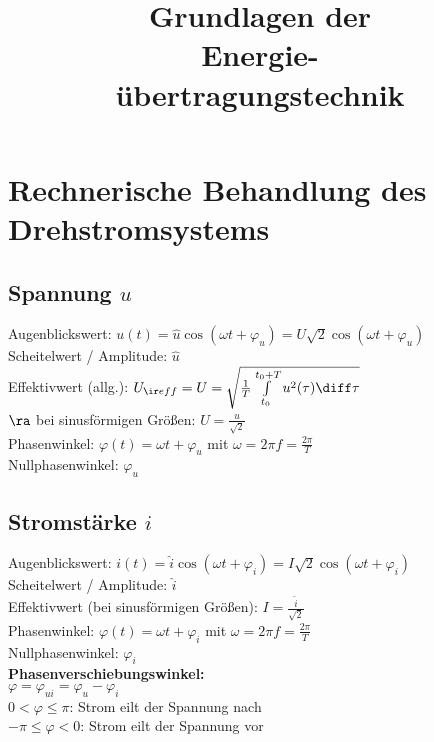 \documentclass[german]{latex4ei/latex4ei_sheet}
\title{Grundlagen der\\ Energie-\\übertragungstechnik}
\begin{document}
\maketitle

\section{Rechnerische Behandlung des Drehstromsystems}

\begin{sectionbox}
	 \subsection{Spannung $u$}

	 Augenblickswert:
	 $u(t) = \hat u \cos ( \omega t + \varphi_u) = U \sqrt 2 \cos (\omega t + \varphi_u)$ \\

	 Scheitelwert / Amplitude:  $\hat u$ \\

	 Effektivwert (allg.): $U_{\ir eff} = U = \sqrt{\frac{1}{T} \int \limits_{t_0}^{t_0 + T} u^2(\tau) \diff \tau}$ \\
	 $\ra $ bei sinusförmigen Größen: $U = \frac{\hat u}{\sqrt 2}$ \\

	 Phasenwinkel: $\varphi (t) = \omega t + \varphi_u$ mit $\omega = 2 \pi f = \frac{2 \pi}{T}$ \\

	 Nullphasenwinkel: $\varphi_u$ \\
\end{sectionbox}

\begin{sectionbox}
	\subsection{Stromstärke $i$ }
	 Augenblickswert:
	 $i(t) = \hat{i} \cos ( \omega t + \varphi_i) = I \sqrt 2 \cos (\omega t + \varphi_i)$ \\

	 Scheitelwert / Amplitude:  $\hat i$ \\

	 Effektivwert (bei sinusförmigen Größen): $I = \frac{\hat i}{\sqrt 2}$ \\

	 Phasenwinkel: $\varphi (t) = \omega t + \varphi_i$ mit $\omega = 2 \pi f = \frac{2 \pi}{T}$ \\

	 Nullphasenwinkel: $\varphi_i$ \\

	 \textbf{Phasenverschiebungswinkel:} \\
	 $\varphi = \varphi_{ui} = \varphi_u - \varphi_i$ \\

	  $0 < \varphi \le \pi$: Strom eilt der Spannung nach \\
	 $-\pi \le \varphi < 0$: Strom eilt der Spannung vor
\end{sectionbox}
\end{document}
